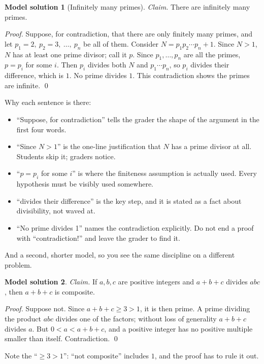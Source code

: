 \documentclass[11pt]{article}
\theoremstyle{plain}
\theoremstyle{definition}
\newtheorem{example}{Model solution}
\begin{document}
\begin{example}[Infinitely many primes]
\textit{Claim.} There are infinitely many primes.

\textit{Proof.} Suppose, for contradiction, that there are only finitely many primes, and let $p_1 = 2,\ p_2 = 3,\ \dots,\ p_n$ be all of them. Consider $N = p_1 p_2 \cdots p_n + 1$. Since $N > 1$, $N$ has at least one prime divisor; call it $p$. Since $p_1, \dots, p_n$ are all the primes, $p = p_i$ for some $i$. Then $p_i$ divides both $N$ and $p_1 \cdots p_n$, so $p_i$ divides their difference, which is $1$. No prime divides $1$. This contradiction shows the primes are infinite. \qed
\end{example}
Why each sentence is there:
\begin{itemize}
  \item ``Suppose, for contradiction'' tells the grader the shape of the argument in the first four words.
  \item ``Since $N > 1$'' is the one-line justification that $N$ has a prime divisor at all. Students skip it; graders notice.
  \item ``$p = p_i$ for some $i$'' is where the finiteness assumption is actually used. Every hypothesis must be visibly used somewhere.
  \item ``divides their difference'' is the key step, and it is stated as a fact about divisibility, not waved at.
  \item ``No prime divides 1'' names the contradiction explicitly. Do not end a proof with ``contradiction!'' and leave the grader to find it.
\end{itemize}

And a second, shorter model, so you see the same discipline on a different problem.

\begin{example}
\textit{Claim.} If $a, b, c$ are positive integers and $a + b + c$ divides $abc$, then $a + b + c$ is composite.

\textit{Proof.} Suppose not. Since $a + b + c \ge 3 > 1$, it is then prime. A prime dividing the product $abc$ divides one of the factors; without loss of generality $a + b + c$ divides $a$. But $0 < a < a + b + c$, and a positive integer has no positive multiple smaller than itself. Contradiction. \qed
\end{example}
Note the ``$\ge 3 > 1$'': ``not composite'' includes $1$, and the proof has to rule it out.

\end{document}
